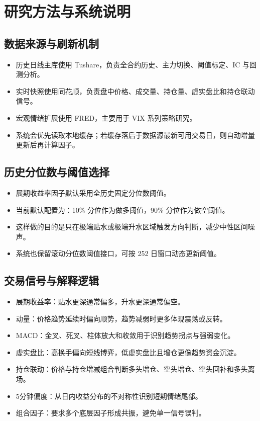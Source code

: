 \documentclass[11pt,a4paper]{ctexart}
\begin{document}
        \section{研究方法与系统说明}
\subsection{数据来源与刷新机制}
\begin{itemize}
\item 历史日线主库使用 Tushare，负责全合约历史、主力切换、阈值标定、IC 与回测分析。
\item 实时快照使用同花顺，负责盘中价格、成交量、持仓量、虚实盘比和持仓联动信号。
\item 宏观情绪扩展使用 FRED，主要用于 VIX 系列策略研究。
\item 系统会优先读取本地缓存；若缓存落后于数据源最新可用交易日，则自动增量更新后再计算因子。
\end{itemize}

\subsection{历史分位数与阈值选择}
\begin{itemize}
\item 展期收益率因子默认采用全历史固定分位数阈值。
\item 当前默认配置为：10\% 分位作为做多阈值，90\% 分位作为做空阈值。
\item 这样做的目的是只在极端贴水或极端升水区域触发方向判断，减少中性区间噪声。
\item 系统也保留滚动分位数阈值接口，可按 252 日窗口动态更新阈值。
\end{itemize}

\subsection{交易信号与解释逻辑}
\begin{itemize}
\item 展期收益率：贴水更深通常偏多，升水更深通常偏空。
\item 动量：价格趋势延续时偏向顺势，趋势减弱时更多体现震荡或反转。
\item MACD：金叉、死叉、柱体放大和收敛用于识别趋势拐点与强弱变化。
\item 虚实盘比：高换手偏向短线博弈，低虚实盘比且增仓更像趋势资金沉淀。
\item 持仓联动：价格与持仓增减组合判断多头增仓、空头增仓、空头回补和多头离场。
\item 5分钟偏度：从日内收益分布的不对称性识别短期情绪尾部。
\item 组合因子：要求多个底层因子形成共振，避免单一信号误判。
\end{itemize}
\end{document}
